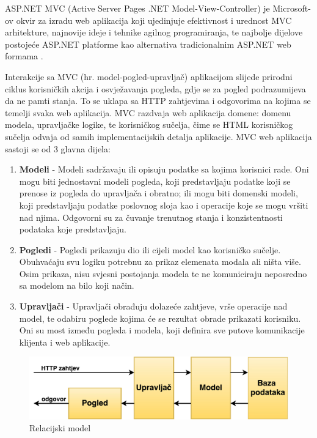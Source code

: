 \documentclass[times, utf8, zavrsni]{fer}
\begin{document}
ASP.NET MVC (Active Server Pages .NET Model-View-Controller) je Microsoft-ov okvir za izradu web aplikacija koji ujedinjuje efektivnost i urednost MVC arhitekture, najnovije ideje i tehnike agilnog programiranja, te najbolje dijelove postojeće ASP.NET platforme kao alternativa tradicionalnim ASP.NET web formama \citep{mvc}.
	
Interakcije sa MVC (hr. model-pogled-upravljač) aplikacijom slijede prirodni ciklus korisničkih akcija i osvježavanja pogleda, gdje se za pogled podrazumijeva da ne pamti stanja. To se uklapa sa HTTP zahtjevima i odgovorima na kojima se temelji svaka web aplikacija. MVC razdvaja web aplikacija domene: domenu modela, upravljačke logike, te korisničkog sučelja, čime se HTML korisničkog sučelja odvaja od samih implementacijskih detalja aplikacije. 
MVC web aplikacija sastoji se od 3 glavna dijela:
\begin{enumerate}
\item \textbf{Modeli} -
Modeli sadržavaju ili opisuju podatke sa kojima korisnici rade. Oni mogu biti jednostavni modeli pogleda, koji predstavljaju podatke koji se prenose iz pogleda do upravljača i obratno; ili mogu biti domenski modeli, koji predstavljaju podatke poslovnog sloja kao i operacije koje se mogu vršiti nad njima. Odgovorni su za čuvanje trenutnog stanja i konzistentnosti podataka koje predstavljaju.

\item \textbf{Pogledi} -
Pogledi prikazuju dio ili cijeli model kao korisničko sučelje. Obuhvaćaju svu logiku potrebnu za prikaz elemenata modala ali ništa više. Osim prikaza, nisu svjesni postojanja modela te ne komuniciraju neposredno sa modelom na bilo koji način.

\item \textbf{Upravljači} -
Upravljači obrađuju dolazeće zahtjeve, vrše operacije nad model, te odabiru poglede kojima će se rezultat obrade prikazati korisniku. Oni su most između pogleda i modela, koji definira sve putove komunikacije klijenta i web aplikacije.\\
\end{enumerate}

\begin{figure}[H]
\centering
\includegraphics[scale=0.7]{img/mvc.pdf}
\caption{Relacijski model}
\label{fig:mvc}
\end{figure}
\end{document}
